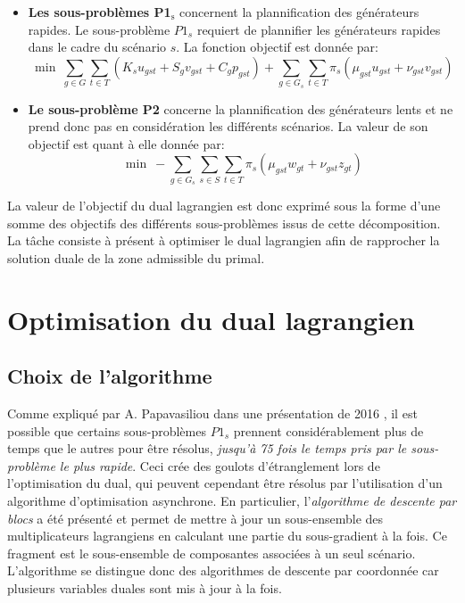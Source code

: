 \begin{itemize}
    \item \textbf{Les sous-problèmes P1$_{\text{s}}$} concernent la plannification des générateurs rapides.
    Le sous-problème $P1_s$ requiert de plannifier les générateurs rapides dans le cadre du scénario $s$.
    La fonction objectif est donnée par:
    \begin{equation}
        \min \ \sum\limits_{g \in G} \sum\limits_{t \in T} (K_s u_{gst} + S_g v_{gst} + C_g p_{gst}) + \sum\limits_{g \in G_s} \sum\limits_{t \in T} \pi_s (\mu_{gst} u_{gst} + \nu_{gst} v_{gst})
    \end{equation}
    \item \textbf{Le sous-problème P2} concerne la plannification des générateurs lents et ne prend donc pas
    en considération les différents scénarios. La valeur de son objectif est quant à elle donnée par:
    \begin{equation}
        \min \ - \sum\limits_{g \in G_s} \sum\limits_{s \in S} \sum\limits_{t \in T} \pi_s (\mu_{gst} w_{gt} + \nu_{gst} z_{gt})
    \end{equation}
\end{itemize}

La valeur de l'objectif du dual lagrangien est donc exprimé sous la forme d'une somme des objectifs des différents sous-problèmes
issus de cette décomposition. La tâche consiste à présent à optimiser le dual lagrangien afin de rapprocher la solution duale de la
zone admissible du primal.

\section{Optimisation du dual lagrangien}

\subsection{Choix de l'algorithme}

Comme expliqué par A. Papavasiliou dans une présentation de 2016 \citep{Asynchronous},
il est possible que certains sous-problèmes $P1_s$ prennent considérablement plus de temps que le autres pour être résolus, \textit{jusqu'à
75 fois le temps pris par le sous-problème le plus rapide}. Ceci crée des goulots d'étranglement lors de l'optimisation du dual,
qui peuvent cependant être résolus par l'utilisation d'un algorithme d'optimisation asynchrone.
En particulier, l'\textit{algorithme de descente par blocs} a été présenté et permet de mettre à jour un sous-ensemble des multiplicateurs
lagrangiens en calculant une partie du sous-gradient à la fois. Ce fragment est le sous-ensemble de composantes associées à un seul
scénario. L'algorithme se distingue donc des algorithmes de descente par coordonnée car plusieurs variables duales sont mis à jour
à la fois.

